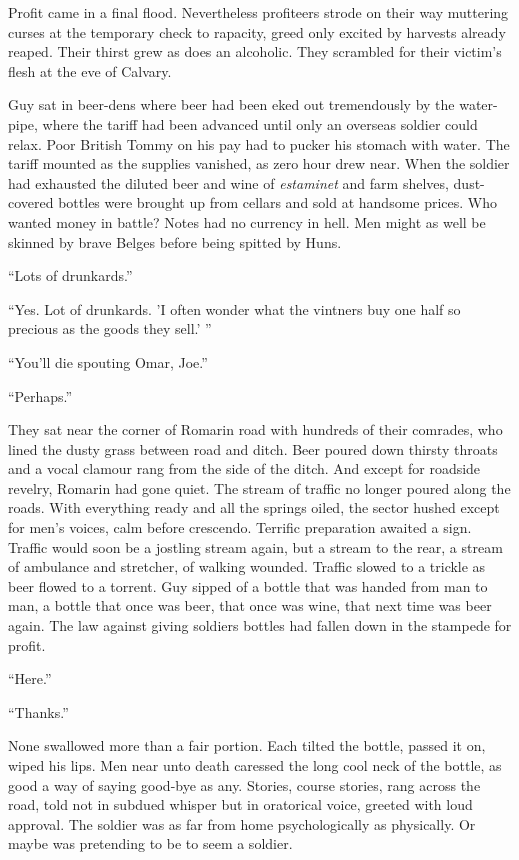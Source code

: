 Profit came in a final flood. Nevertheless profiteers strode on their way muttering curses at the temporary check to rapacity, greed only excited by harvests already reaped. Their thirst grew as does an alcoholic. They scrambled for their victim's flesh at the eve of Calvary.

Guy sat in beer-dens where beer had been eked out tremendously by the water-pipe, where the tariff had been advanced until only an overseas soldier could relax. Poor British Tommy on his pay had to pucker his stomach with water. The tariff mounted as the supplies vanished, as zero hour drew near. When the soldier had exhausted the diluted beer and wine of \textit{estaminet} and farm shelves, dust-covered bottles were brought up from cellars and sold at handsome prices. Who wanted money in battle? Notes had no currency in hell. Men might as well be skinned by brave Belges before being spitted by Huns.

``Lots of drunkards.''

``Yes. Lot of drunkards. 'I often wonder what the vintners buy one half so precious as the goods they sell.' ''

``You'll die spouting Omar, Joe.''

``Perhaps.''

They sat near the corner of Romarin road with hundreds of their comrades, who lined the dusty grass between road and ditch. Beer poured down thirsty throats and a vocal clamour rang from the side of the ditch. And except for roadside revelry, Romarin had gone quiet. The stream of traffic no longer poured along the roads. With everything ready and all the springs oiled, the sector hushed except for men's voices, calm before crescendo. Terrific preparation awaited a sign. Traffic would soon be a jostling stream again, but a stream to the rear, a stream of ambulance and stretcher, of walking wounded. Traffic slowed to a trickle as beer flowed to a torrent. Guy sipped of a bottle that was handed from man to man, a bottle that once was beer, that once was wine, that next time was beer again. The law against giving soldiers bottles had fallen down in the stampede for profit.

``Here.''

``Thanks.''

None swallowed more than a fair portion. Each tilted the bottle, passed it on, wiped his lips. Men near unto death caressed the long cool neck of the bottle, as good a way of saying good-bye as any. Stories, course stories, rang across the road, told not in subdued whisper but in oratorical voice, greeted with loud approval. The soldier was as far from home psychologically as physically. Or maybe was pretending to be to seem a soldier.

